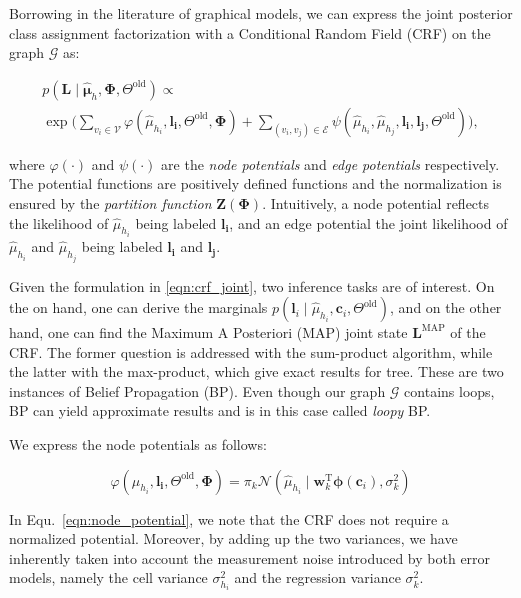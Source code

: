 Borrowing in the literature of graphical models, we can express the joint
posterior class assignment factorization with a Conditional Random Field (CRF)
on the graph $\mathcal{G}$ as:

\begin{eqnarray}
\label{eqn:crf_joint}
p(\mathbf{L}\mid\hat{\boldsymbol\mu}_h,\boldsymbol{\Phi},\Theta^\text{old})
\propto
\phantom{aaaaaaaaaaaaaaaaaaaaaaaaaaaa}\\ \nonumber
\exp\bigg(\sum_{v_i\in\mathcal{V}}
\varphi(\hat{\mu}_{h_i},\mathbf{l_i},\Theta^\text{old},\boldsymbol{\Phi})+
\sum_{(v_i,v_j)\in\mathcal{E}}\psi(\hat{\mu}_{h_i},\hat{\mu}_{h_j},\mathbf{l_i},
\mathbf{l_j},\Theta^\text{old})\bigg),
\end{eqnarray}

where $\varphi(\cdot)$ and $\psi(\cdot)$ are the \emph{node potentials} and
\emph{edge potentials} respectively. The potential functions are positively
defined functions and the normalization is ensured by the
\emph{partition function} $\mathbf{Z}(\boldsymbol{\Phi})$. Intuitively, a node 
potential reflects the likelihood of $\hat{\mu}_{h_i}$ being labeled
$\mathbf{l_i}$, and an edge potential the joint likelihood of $\hat{\mu}_{h_i}$
and $\hat{\mu}_{h_j}$ being labeled $\mathbf{l_i}$ and $\mathbf{l_j}$.

Given the formulation in \eqref{eqn:crf_joint}, two inference tasks are of
interest. On the on hand, one can derive the marginals
$p(\mathbf{l}_i\mid\hat{\mu}_{h_i},\mathbf{c}_i,\Theta^\text{old})$, and on the
other hand, one can find the Maximum A Posteriori (MAP) joint state
$\mathbf{L}^\text{MAP}$ of the CRF. The former question is addressed with the
sum-product algorithm, while the latter with the max-product, which give exact
results for tree. These are two instances of Belief Propagation (BP). Even
though our graph $\mathcal{G}$ contains loops, BP can yield approximate results
and is in this case called \emph{loopy} BP.

We express the node potentials as follows:

\begin{equation}
\label{eqn:node_potential}
\varphi(\hat{\mu}_{h_i},\mathbf{l_i},\Theta^\text{old},\boldsymbol{\Phi})=
\pi_k\mathcal{N}(\hat{\mu}_{h_i}\mid\mathbf{w}_k^\text{T}
\boldsymbol{\phi}(\mathbf{c}_i),\sigma^2_k)
\end{equation}

In Equ.~\eqref{eqn:node_potential}, we note that the CRF does not require a
normalized potential. Moreover, by adding up the two variances, we have
inherently taken into account the measurement noise introduced by both error
models, namely the cell variance $\sigma^2_{h_i}$ and the regression variance
$\sigma^2_{k}$.

